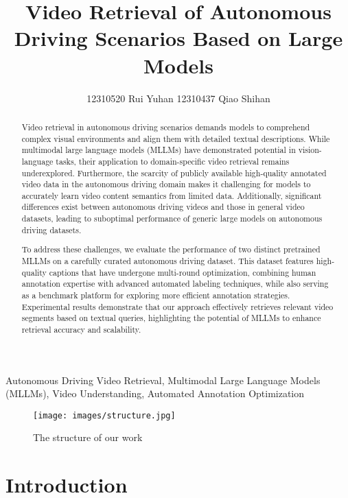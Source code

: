 \documentclass[lettersize,journal]{IEEEtran}
\begin{document}
\title{Video Retrieval of Autonomous Driving Scenarios Based on Large Models}
\author{12310520 Rui Yuhan   12310437 Qiao Shihan}


\maketitle

\begin{abstract}
Video retrieval in autonomous driving scenarios demands models to comprehend complex visual environments and align them with detailed textual descriptions. While multimodal large language models (MLLMs) have demonstrated potential in vision-language tasks, their application to domain-specific video retrieval remains underexplored. Furthermore, the scarcity of publicly available high-quality annotated video data in the autonomous driving domain makes it challenging for models to accurately learn video content semantics from limited data. Additionally, significant differences exist between autonomous driving videos and those in general video datasets, leading to suboptimal performance of generic large models on autonomous driving datasets.

To address these challenges, we evaluate the performance of two distinct pretrained MLLMs on a carefully curated autonomous driving dataset. This dataset features high-quality captions that have undergone multi-round optimization, combining human annotation expertise with advanced automated labeling techniques, while also serving as a benchmark platform for exploring more efficient annotation strategies. Experimental results demonstrate that our approach effectively retrieves relevant video segments based on textual queries, highlighting the potential of MLLMs to enhance retrieval accuracy and scalability.

\end{abstract}

\begin{IEEEkeywords}
Autonomous Driving Video Retrieval, Multimodal Large Language Models (MLLMs), Video Understanding, Automated Annotation Optimization
\end{IEEEkeywords}

\begin{figure*}
    \centering
    \texttt{[image: images/structure.jpg]}
    \caption{The structure of our work}
    \label{fig:1}
\end{figure*}

\section{Introduction}
\end{document}
